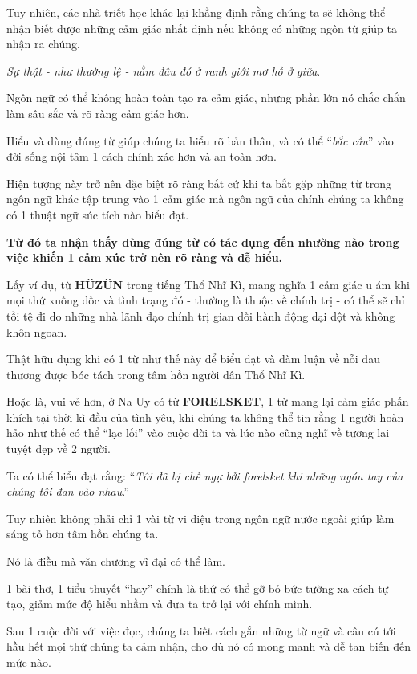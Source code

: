 \documentclass{book}
\numberwithin{equation}{section}
\begin{document}
Tuy nhiên, các nhà triết học khác lại khẳng định rằng chúng ta sẽ không thể nhận biết được những cảm giác nhất định nếu không có những ngôn từ giúp ta nhận ra chúng.

%
\textit{Sự thật - như thường lệ - nằm đâu đó ở ranh giới mơ hồ ở giữa}.

Ngôn ngữ có thể không hoàn toàn tạo ra cảm giác, nhưng phần lớn nó chắc chắn làm sâu sắc và rõ ràng cảm giác hơn.

Hiểu và dùng đúng từ giúp chúng ta hiểu rõ bản thân, và có thể ``\textit{bắc cầu}'' vào đời sống nội tâm 1 cách chính xác hơn và an toàn hơn.

%
Hiện tượng này trở nên đặc biệt rõ ràng bất cứ khi ta bắt gặp những từ trong ngôn ngữ khác tập trung vào 1 cảm giác mà ngôn ngữ của chính chúng ta không có 1 thuật ngữ súc tích nào biểu đạt.

\textbf{Từ đó ta nhận thấy dùng đúng từ có tác dụng đến nhường nào trong việc khiến 1 cảm xúc trở nên rõ ràng và dễ hiểu.}

%
Lấy ví dụ, từ \textbf{HÜZÜN} trong tiếng Thổ Nhĩ Kì, mang nghĩa 1 cảm giác u ám khi mọi thứ xuống dốc và tình trạng đó - thường là thuộc về chính trị - có thể sẽ chỉ tồi tệ đi do những nhà lãnh đạo chính trị gian dối hành động dại dột và không khôn ngoan.

Thật hữu dụng khi có 1 từ như thế này để biểu đạt và đàm luận về nỗi đau thương được bóc tách trong tâm hồn người dân Thổ Nhĩ Kì.

%
Hoặc là, vui vẻ hơn, ở Na Uy có từ \textbf{FORELSKET}, 1 từ mang lại cảm giác phấn khích tại thời kì đầu của tình yêu, khi chúng ta không thể tin rằng 1 người hoàn hảo như thế có thể ``lạc lối'' vào cuộc đời ta và lúc nào cũng nghĩ về tương lai tuyệt đẹp về 2 người.

Ta có thể biểu đạt rằng: ``\textit{Tôi đã bị chế ngự bởi forelsket khi những ngón tay của chúng tôi đan vào nhau}.''

%
Tuy nhiên không phải chỉ 1 vài từ vi diệu trong ngôn ngữ nước ngoài giúp làm sáng tỏ hơn tâm hồn chúng ta.

Nó là điều mà văn chương vĩ đại có thể làm.

1 bài thơ, 1 tiểu thuyết ``hay'' chính là thứ có thể gỡ bỏ bức tường xa cách tự tạo, giảm mức độ hiểu nhầm và đưa ta trở lại với chính mình.

Sau 1 cuộc đời với việc đọc, chúng ta biết cách gắn những từ ngữ và câu cú tới hầu hết mọi thứ chúng ta cảm nhận, cho dù nó có mong manh và dễ tan biến đến mức nào.
\end{document}
